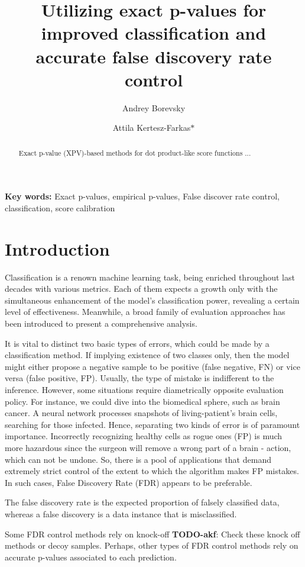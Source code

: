 \documentclass{article}
\author{Andrey Borevsky}
\author{Attila Kertesz-Farkas$\ast$}
\affil{Laboratory on AI for Computational Biology, Faculty of Computer Science, HSE University,  11 Pokrovsky Bvld., Moscow 109028, Russian Federation}
\title{Utilizing exact p-values for improved classification and accurate false discovery rate control}
\newcommand{\todo}[2]{{\color{red} {\bf TODO-#1}: #2}}
\begin{document}
\maketitle

\begin{abstract}
Exact p-value (XPV)-based methods for dot product-like score functions ...


\end{abstract}
\textbf{Key words:} Exact p-values, empirical p-values, False discover rate control, classification, score calibration

\section{Introduction}

Classification is a renown machine learning task, being enriched throughout last decades with various metrics. Each of them expects a growth only with the simultaneous enhancement of the model’s classification power, revealing a certain level of effectiveness. Meanwhile, a broad family of evaluation approaches has been introduced to present a comprehensive analysis.

It is vital to distinct two basic types of errors, which could be made by a classification method. If implying existence of two classes only, then the model might either propose a negative sample to be positive (false negative, FN) or vice versa (false positive, FP). Usually, the type of mistake is indifferent to the inference. However, some situations require diametrically opposite evaluation policy. For instance, we could dive into the biomedical sphere, such as brain cancer. A neural network processes snapshots of living-patient’s brain cells, searching for those infected. Hence, separating two kinds of error is of paramount importance. Incorrectly recognizing healthy cells as rogue ones (FP) is much more hazardous since the surgeon will remove a wrong part of a brain - action, which can not be undone. So, there is a pool of applications that demand extremely strict control of the extent to which the algorithm makes FP mistakes. In such cases, False Discovery Rate (FDR) appears to be preferable.

The false discovery rate is the expected proportion of falsely classified data, whereas a false discovery is a data instance that is misclassified. 

Some FDR control methods rely on knock-off \todo{akf}{Check these knock off methods} or decoy samples. Perhaps, other types of FDR control methods rely on accurate p-values associated to each prediction.
\end{document}
